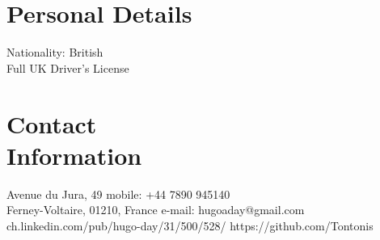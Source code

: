 \documentclass[margin,line]{resume}
\begin{document}
\begin{resume}

    \section{\mysidestyle Personal Details}
    Nationality: British \vspace{0mm}\\\vspace{-4.5mm}%
    Full UK Driver's License  \vspace{0mm}\\\vspace{-4.5mm}%


    \section{\mysidestyle Contact\\Information}
    Avenue du Jura, 49                            \hfill mobile: +44 7890 945140          \vspace{0mm}\\\vspace{0mm}%
    Ferney-Voltaire, 01210, France                          \hfill e-mail: hugoaday@gmail.com  \vspace{0mm}\\\vspace{-4.5mm} %
    ch.linkedin.com/pub/hugo-day/31/500/528/    \hfill https://github.com/Tontonis  \vspace{0mm}\\\vspace{-4.5mm}%

%


\end{resume}
\end{document}
